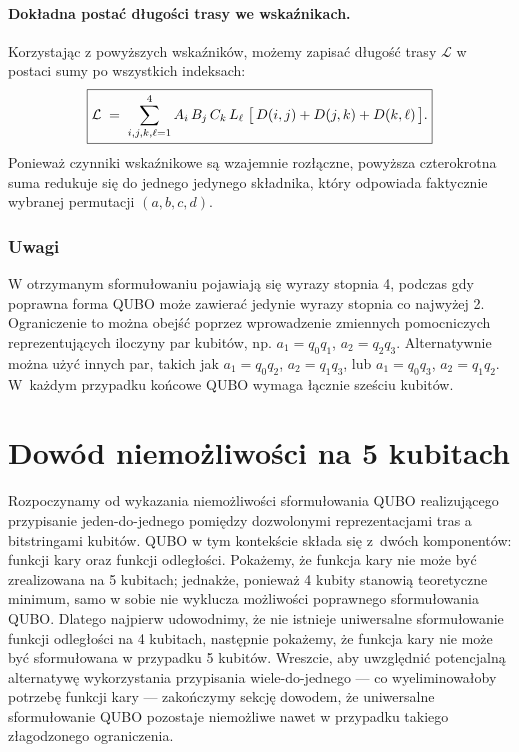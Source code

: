\paragraph{Dokładna postać długości trasy we wskaźnikach.}

Korzystając z powyższych wskaźników, możemy zapisać długość trasy \(\mathcal{L}\) w postaci sumy po wszystkich indeksach:
\begin{equation}
\boxed{%
\mathcal{L} \;=\; \sum_{i,j,k,\ell=1}^4 A_i\,B_j\,C_k\,L_\ell \;\bigl[\,D(i,j)+D(j,k)+D(k,\ell)\,\bigr].%
}
\end{equation}
Ponieważ czynniki wskaźnikowe są wzajemnie rozłączne, powyższa czterokrotna suma redukuje się do jednego jedynego składnika, który odpowiada faktycznie wybranej permutacji $(a,b,c,d)$.


\subsubsection{Uwagi}

W otrzymanym sformułowaniu pojawiają się wyrazy stopnia 4, podczas gdy poprawna forma QUBO może zawierać jedynie wyrazy stopnia co najwyżej 2. Ograniczenie to można obejść poprzez wprowadzenie zmiennych pomocniczych reprezentujących iloczyny par kubitów, np. $a_1 = q_0 q_1$, $a_2 = q_2 q_3$. Alternatywnie można użyć innych par, takich jak $a_1 = q_0 q_2$, $a_2 = q_1 q_3$, lub $a_1 = q_0 q_3$, $a_2 = q_1 q_2$. W~każdym przypadku końcowe QUBO wymaga łącznie sześciu kubitów.


\section{Dowód niemożliwości na 5 kubitach}

Rozpoczynamy od wykazania niemożliwości sformułowania QUBO realizującego przypisanie jeden-do-jednego pomiędzy dozwolonymi reprezentacjami tras a bitstringami kubitów. QUBO w tym kontekście składa się z~dwóch komponentów: funkcji kary oraz funkcji odległości. Pokażemy, że funkcja kary nie może być zrealizowana na 5 kubitach; jednakże, ponieważ 4 kubity stanowią teoretyczne minimum, samo w sobie nie wyklucza możliwości poprawnego sformułowania QUBO. Dlatego najpierw udowodnimy, że nie istnieje uniwersalne sformułowanie funkcji odległości na 4 kubitach, następnie pokażemy, że funkcja kary nie może być sformułowana w przypadku 5 kubitów. Wreszcie, aby uwzględnić potencjalną alternatywę wykorzystania przypisania wiele-do-jednego — co wyeliminowałoby potrzebę funkcji kary — zakończymy sekcję dowodem, że uniwersalne sformułowanie QUBO pozostaje niemożliwe nawet w przypadku takiego złagodzonego ograniczenia.

